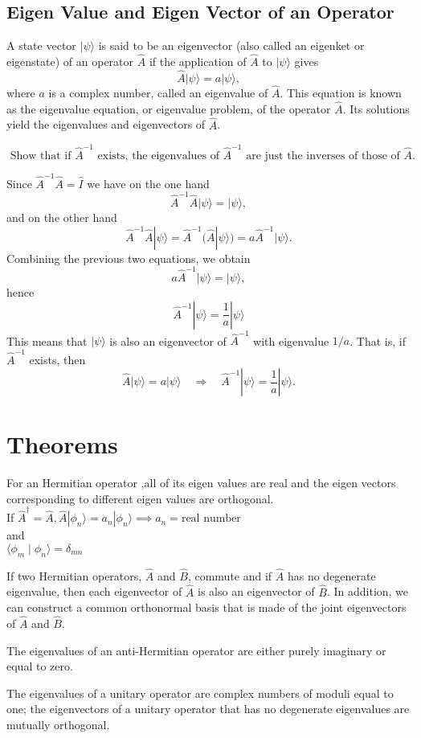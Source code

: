\subsection{Eigen Value and Eigen Vector of an Operator}
A state vector $|\psi\rangle$ is said to be an eigenvector (also called an eigenket or eigenstate) of an operator $\hat{A}$ if the application of $\hat{A}$ to $|\psi\rangle$ gives
$$
\hat{A}|\psi\rangle=a|\psi\rangle,
$$
where $a$ is a complex number, called an eigenvalue of $\hat{A}$. This equation is known as the eigenvalue equation, or eigenvalue problem, of the operator $\hat{A}$. Its solutions yield the eigenvalues and eigenvectors of $\hat{A}$.
\begin{exercise}
	$\text { Show that if } \hat{A}^{-1} \text { exists, the eigenvalues of } \hat{A}^{-1} \text { are just the inverses of those of } \hat{A} \text {. }$
\end{exercise}
\begin{answer}
Since $\hat{A}^{-1} \hat{A}=\hat{I}$ we have on the one hand
$$
\hat{A}^{-1} \hat{A}|\psi\rangle=|\psi\rangle,
$$
and on the other hand
$$
\hat{A}^{-1} \hat{A}|\psi\rangle=\hat{A}^{-1}(\hat{A}|\psi\rangle)=a \hat{A}^{-1}|\psi\rangle .
$$
Combining the previous two equations, we obtain
$$
a \hat{A}^{-1}|\psi\rangle=|\psi\rangle,
$$	
hence
$$
\hat{A}^{-1}|\psi\rangle=\frac{1}{a}|\psi\rangle
$$
This means that $|\psi\rangle$ is also an eigenvector of $\hat{A}^{-1}$ with eigenvalue $1 / a$. That is, if $\hat{A}^{-1}$ exists, then
$$
\hat{A}|\psi\rangle=a|\psi\rangle \quad \Longrightarrow \quad \hat{A}^{-1}|\psi\rangle=\frac{1}{a}|\psi\rangle .
$$
\end{answer}
\section{Theorems} 
\begin{theorem}
For an Hermitian operator ,all of its eigen values are real and the eigen vectors corresponding to different eigen values are orthogonal.	\\
If $\hat{A}^{\dagger}=\hat{A}, \hat{A}|\phi_{n}\rangle =a_n |\phi_{n}\rangle \implies a_n=\text{real number }$\\
and\\
$\langle \phi_{m}\mid \phi_{n}\rangle=\delta_{mn}$
\end{theorem}
\begin{theorem}
If two Hermitian operators, $\hat{A}$ and $\hat{B}$, commute and if $\hat{A}$ has no degenerate eigenvalue, then each eigenvector of $\hat{A}$ is also an eigenvector of $\hat{B}$. In addition, we can construct a common orthonormal basis that is made of the joint eigenvectors of $\hat{A}$ and $\hat{B}$.
\end{theorem}
\begin{theorem}
 The eigenvalues of an anti-Hermitian operator are either purely imaginary or equal to zero.
\end{theorem}
\begin{theorem}
	 The eigenvalues of a unitary operator are complex numbers of moduli equal to one; the eigenvectors of a unitary operator that has no degenerate eigenvalues are mutually orthogonal.
\end{theorem}
